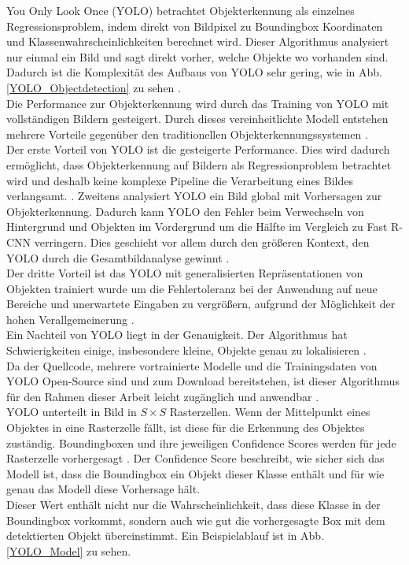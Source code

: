 {	\glqq You Only Look Once\grqq{} (YOLO) betrachtet Objekterkennung als einzelnes Regressionsproblem, indem direkt von Bildpixel zu Boundingbox Koordinaten und Klassenwahrscheinlichkeiten berechnet wird. Dieser Algorithmus analysiert nur einmal ein Bild und sagt direkt vorher, welche Objekte wo vorhanden sind. Dadurch ist die Komplexität des  Aufbaus von YOLO sehr gering, wie in Abb. \ref{YOLO_Objectdetection} zu sehen \citep{Redmon2016}. \\
	Die Performance zur Objekterkennung wird durch das Training von YOLO mit vollständigen Bildern gesteigert. Durch dieses vereinheitlichte Modell entstehen mehrere Vorteile gegenüber den traditionellen Objekterkennungssystemen \citep{Redmon2016}. \\
	Der erste Vorteil von YOLO ist die gesteigerte Performance. Dies wird dadurch ermöglicht, dass Objekterkennung auf Bildern als Regressionproblem betrachtet wird und deshalb keine komplexe Pipeline die Verarbeitung eines Bildes verlangsamt.  \citep{Redmon2016}. 
	Zweitens analysiert YOLO ein Bild global mit Vorhersagen zur Objekterkennung. Dadurch kann YOLO den Fehler beim Verwechseln von Hintergrund und Objekten im Vordergrund um die Hälfte im Vergleich zu Fast R-CNN verringern. Dies geschieht vor allem durch den größeren Kontext, den YOLO durch die Gesamtbildanalyse gewinnt \citep{Redmon2016}. \\
	Der dritte Vorteil ist das YOLO mit generalisierten Repräsentationen von Objekten trainiert wurde um die Fehlertoleranz bei der Anwendung auf neue Bereiche und unerwartete Eingaben zu vergrößern, aufgrund der Möglichkeit der hohen Verallgemeinerung \citep{Redmon2016}. \\
	Ein Nachteil von YOLO liegt in der Genauigkeit. Der Algorithmus hat Schwierigkeiten einige, insbesondere kleine, Objekte genau zu lokalisieren \citep{Redmon2016}. \\
	Da der Quellcode, mehrere vortrainierte Modelle und die Trainingsdaten von YOLO Open-Source sind und zum Download bereitstehen, ist dieser Algorithmus für den Rahmen dieser Arbeit leicht zugänglich und anwendbar \citep{Redmon2016}. \\

	YOLO unterteilt in Bild in $S \times S $ Rasterzellen. Wenn der Mittelpunkt eines Objektes in eine Rasterzelle fällt, ist diese für die Erkennung des Objektes zuständig. Boundingboxen und ihre jeweiligen Confidence Scores werden für jede Rasterzelle vorhergesagt \citep{Redmon2016}.
	Der Confidence Score beschreibt, wie sicher sich das Modell ist, dass die Boundingbox ein Objekt dieser Klasse enthält und für wie genau das Modell diese Vorhersage hält. \\
	Dieser Wert enthält nicht nur die Wahrscheinlichkeit, dass diese Klasse in der Boundingbox vorkommt, sondern auch wie gut die vorhergesagte Box mit dem detektierten Objekt übereinstimmt. Ein Beispielablauf ist in Abb. \ref{YOLO_Model} zu sehen.

}
